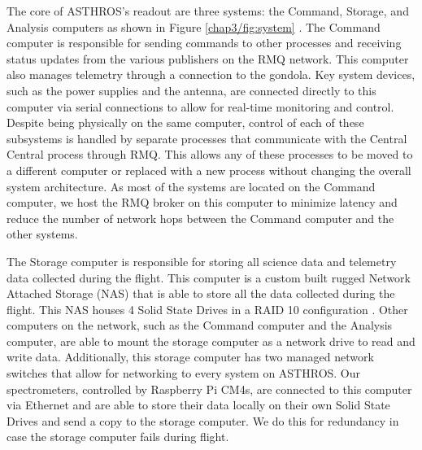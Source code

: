The core of ASTHROS's readout are three systems: the Command, Storage, and Analysis computers as shown in Figure \ref{chap3/fig:system} \cite{horton2024readout}.
The Command computer is responsible for sending commands to other processes and receiving status updates from the various publishers on the RMQ network. 
This computer also manages telemetry through a connection to the gondola. 
Key system devices, such as the power supplies and the antenna, are connected directly to this computer via serial connections to allow for real-time monitoring and control.
Despite being physically on the same computer, control of each of these subsystems is handled by separate processes that communicate with the Central Central process through RMQ.
This allows any of these processes to be moved to a different computer or replaced with a new process without changing the overall system architecture.
As most of the systems are located on the Command computer, we host the RMQ broker on this computer to minimize latency and reduce the number of network hops between the Command computer and the other systems.

The Storage computer is responsible for storing all science data and telemetry data collected during the flight.
This computer is a custom built rugged Network Attached Storage (NAS) that is able to store all the data collected during the flight.
This NAS houses 4 Solid State Drives in a RAID 10 configuration \cite{chen1994raid}.
Other computers on the network, such as the Command computer and the Analysis computer, are able to mount the storage computer as a network drive to read and write data.
Additionally, this storage computer has two managed network switches that allow for networking to every system on ASTHROS.
Our spectrometers, controlled by Raspberry Pi CM4s, are connected to this computer via Ethernet and are able to store their data locally on their own Solid State Drives and send a copy to the storage computer.
We do this for redundancy in case the storage computer fails during flight.

